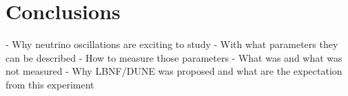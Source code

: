 \section{Conclusions}

- Why neutrino oscillations are exciting to study
- With what parameters they can be described
- How to measure those parameters
- What was and what was not measured
- Why LBNF/DUNE was proposed and what are the expectation from this experiment
